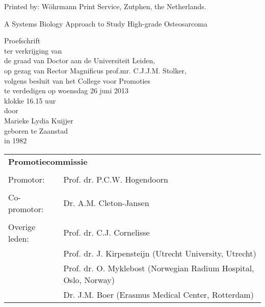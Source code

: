 \documentclass[12pt,b5paper]{book}
\begin{document}
\begin{titlepage}
\begin{minipage}[b]{0.55\linewidth}
{\begin{singlespace}
{			Printed by: W\"ohrmann Print Service, Zutphen, the Netherlands.
		}%
	\end{singlespace}
	}%
\end{minipage}
\newpage
%
	\thispagestyle{empty}
	{\centering    
		\vspace*{1.cm} 
 	\vspace*{3.cm} 
		\begin{doublespace}	%
	  	{\huge\sc A Systems Biology Approach to Study High-grade Osteosarcoma}\\
		\end{doublespace}		%
	\vspace*{3.5cm}
			\huge Proefschrift\\
			\large
	  \vspace{1.5cm}
			ter verkrijging van\\
		  	de graad van Doctor aan de Universiteit Leiden,\\
			op gezag van Rector Magnificus prof.mr. C.J.J.M. Stolker,\\
			volgens besluit van het College voor Promoties\\
			te verdedigen op woensdag 26 juni 2013\\
			klokke 16.15 uur\\
  	\vspace{4.cm}
			door\\
	\vspace {0.5cm}
			Marieke Lydia Kuijjer\\	
			geboren te Zaanstad\\
			in 1982\\
}%
\pagebreak 
	\thispagestyle{empty}
	\vspace {1cm}
\begin{tabular}{ll}
	\multicolumn{2}{l}{{\bf Promotiecommissie}}\\
		\\
		Promotor: & Prof. dr. P.C.W. Hogendoorn\\
		\\
		Co-promotor: & Dr. A.M. Cleton-Jansen\\
		\\
		Overige leden: & Prof. dr. C.J. Cornelisse\\
		& Prof. dr. J. Kirpensteijn (Utrecht University, Utrecht)\\
		& Prof. dr. O. Myklebost (Norwegian Radium Hospital, Oslo, Norway)\\
		& Dr. J.M. Boer (Erasmus Medical Center, Rotterdam)\\
\end{tabular}

\end{titlepage}
%
\end{document}
